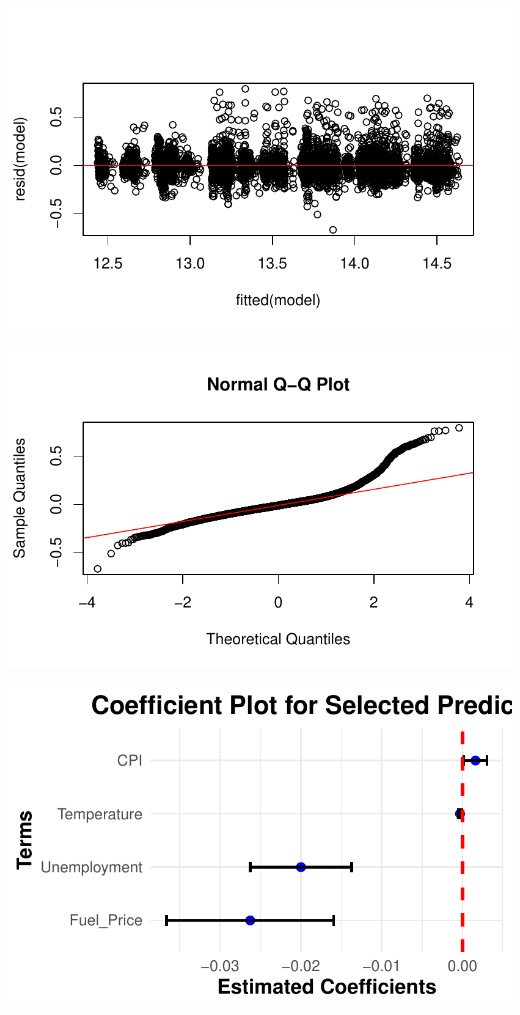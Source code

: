 \documentclass[
  letterpaper,
  DIV=11,
  numbers=noendperiod]{scrartcl}
\begin{document}
\includegraphics{678final_files/figure-pdf/unnamed-chunk-9-1.pdf}

\includegraphics{678final_files/figure-pdf/unnamed-chunk-9-2.pdf}

\includegraphics{678final_files/figure-pdf/unnamed-chunk-9-3.pdf}
\end{document}
